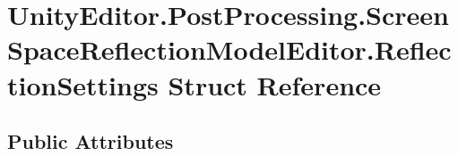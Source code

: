 \hypertarget{struct_unity_editor_1_1_post_processing_1_1_screen_space_reflection_model_editor_1_1_reflection_settings}{}\section{Unity\+Editor.\+Post\+Processing.\+Screen\+Space\+Reflection\+Model\+Editor.\+Reflection\+Settings Struct Reference}
\label{struct_unity_editor_1_1_post_processing_1_1_screen_space_reflection_model_editor_1_1_reflection_settings}
\subsection*{Public Attributes}

